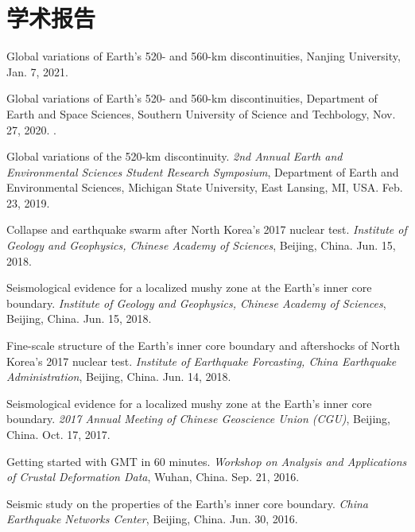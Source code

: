 \section*{学术报告}
\begin{etaremune}
\item
	Global variations of Earth's 520- and 560-km discontinuities,
	Nanjing University,
	Jan. 7, 2021.
\item
	Global variations of Earth's 520- and 560-km discontinuities,
	Department of Earth and Space Sciences, Southern University of Science and Techbology,
	Nov. 27, 2020.
	\invited.
\item
    Global variations of the 520-km discontinuity.
    \textit{ 2nd Annual Earth and Environmental Sciences Student Research Symposium},
    Department of Earth and Environmental Sciences, Michigan State University, East Lansing, MI, USA.
    Feb. 23, 2019.
\item
    Collapse and earthquake swarm after North Korea's 2017 nuclear test.
    \textit{Institute of Geology and Geophysics, Chinese Academy of Sciences}, Beijing, China.
    Jun. 15, 2018.
\item
    Seismological evidence for a localized mushy zone at the Earth's inner core boundary.
    \textit{Institute of Geology and Geophysics, Chinese Academy of Sciences}, Beijing, China.
    Jun. 15, 2018.
    \invited
\item
    Fine-scale structure of the Earth's inner core boundary and aftershocks of North Korea's 2017 nuclear test.
    \textit{Institute of Earthquake Forcasting, China Earthquake Administration}, Beijing, China.
    Jun. 14, 2018.
\item
    Seismological evidence for a localized mushy zone at the Earth's inner core boundary.
    \textit{2017 Annual Meeting of Chinese Geoscience Union (CGU)}, Beijing, China.
    Oct. 17, 2017.
    \invited
\item
    Getting started with GMT in 60 minutes.
    \textit{Workshop on Analysis and Applications of Crustal Deformation Data}, Wuhan, China.
    Sep. 21, 2016.
    \invited
\item
    Seismic study on the properties of the Earth's inner core boundary.
    \textit{China Earthquake Networks Center}, Beijing, China.
    Jun. 30, 2016.
    \invited
\end{etaremune}
